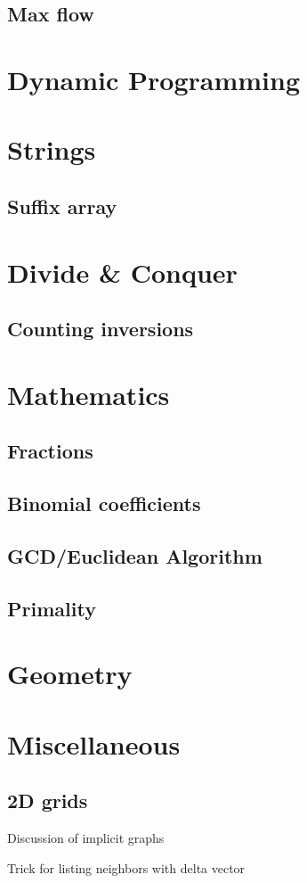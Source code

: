 \documentclass[10pt]{article}
\begin{document}
\subsection{Max flow}

\section{Dynamic Programming}

\section{Strings}

\subsection{Suffix array}

\section{Divide \& Conquer}

\subsection{Counting inversions}

\section{Mathematics}

\subsection{Fractions}

\subsection{Binomial coefficients}

\subsection{GCD/Euclidean Algorithm}

\subsection{Primality}

\section{Geometry}

\section{Miscellaneous}

\subsection{2D grids}

Discussion of implicit graphs

Trick for listing neighbors with delta vector
\end{document}
